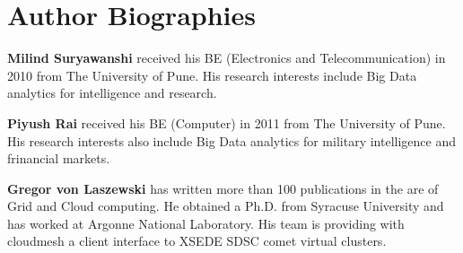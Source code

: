 \documentclass[9pt,twocolumn,twoside]{../../styles/osajnl}
\begin{document}
	

 
\section*{Author Biographies}
\begingroup
\setlength\intextsep{0pt}
\begin{minipage}{1.0\columnwidth}
  \noindent
  {\bfseries Milind Suryawanshi} received his BE (Electronics and
  Telecommunication) in 2010 from The University of Pune. His research
  interests include Big Data analytics for intelligence and research.
\end{minipage}
\begin{minipage}{1.0\columnwidth} 
  \noindent
  {\bfseries Piyush Rai} received his BE (Computer) in 2011 from The
  University of Pune. His research interests also include Big Data
  analytics for military intelligence and frinancial markets.
\end{minipage}
\begin{minipage}{1.0\columnwidth} 
  \noindent
  {\bfseries Gregor von Laszewski} has written more than 100
  publications in the are of Grid and Cloud computing. He obtained a
  Ph.D. from Syracuse University and has worked at Argonne National
  Laboratory. His team is providing with cloudmesh a client interface
  to XSEDE SDSC comet virtual clusters.
\end{minipage}

\endgroup
\end{document}
